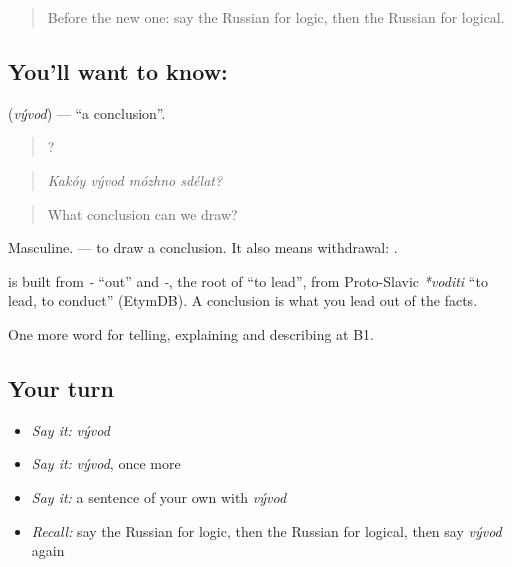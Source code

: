 \label{lesson:RU-C344-vyvod}



\begin{quote}
Before the new one: say the Russian for logic, then the Russian for logical.
\end{quote}

\subsection*{You'll want to know: }
\textbf{} (\emph{vývod}) — \textquotedblleft{}a conclusion\textquotedblright{}.

\begin{quote}
   ?
\end{quote}

\begin{quote}
\emph{Kakóy vývod mózhno sdélat?}
\end{quote}

\begin{quote}
What conclusion can we draw?
\end{quote}

Masculine. \emph{ } — to draw a conclusion. It also means withdrawal: \emph{ }.

\begin{cousinweb}
\textbf{} is built from \emph{-} \textquotedblleft{}out\textquotedblright{} and \emph{-}, the root of \emph{} \textquotedblleft{}to lead\textquotedblright{}, from Proto-Slavic \emph{*voditi} \textquotedblleft{}to lead, to conduct\textquotedblright{} (EtymDB). A conclusion is what you lead out of the facts.
\end{cousinweb}

\begin{grammarlens}[title={What you've built}]
One more word for telling, explaining and describing at B1.
\end{grammarlens}

\subsection*{Your turn}
\begin{itemize}
\raggedright
  \item \emph{Say it:} \emph{vývod}
  \item \emph{Say it:} \emph{vývod}, once more
  \item \emph{Say it:} a sentence of your own with \emph{vývod}
  \item \emph{Recall:} say the Russian for logic, then the Russian for logical, then say \emph{vývod} again
\end{itemize}


